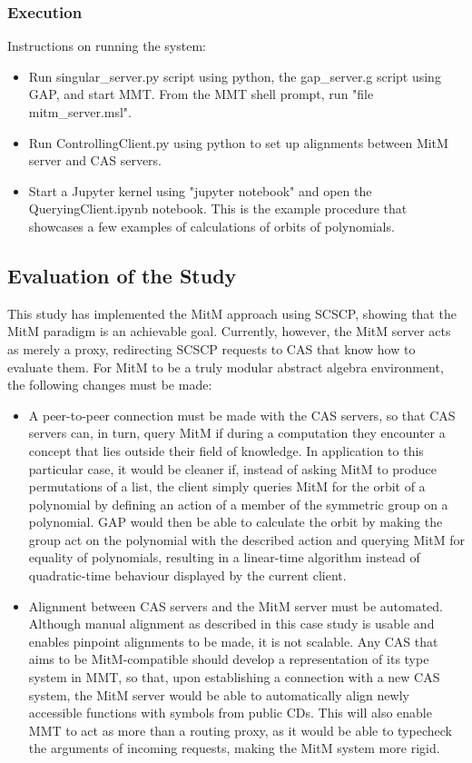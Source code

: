 \subsubsection{Execution}
Instructions on running the system:
\begin{itemize}
  \item Run singular\_server.py script using python, the gap\_server.g script
    using GAP, and start MMT. From the MMT shell prompt, run 
    "file mitm\_server.msl".
  \item Run ControllingClient.py using python to set up alignments between
    MitM server and CAS servers.
  \item Start a Jupyter kernel using "jupyter notebook" and open the 
    QueryingClient.ipynb notebook. This is the example procedure that showcases
    a few examples of calculations of orbits of polynomials.
\end{itemize}

\subsection{Evaluation of the Study}
This study has implemented the MitM approach using SCSCP, showing that the MitM 
paradigm is an achievable goal. Currently, however, the MitM server acts as 
merely a proxy, redirecting SCSCP requests to CAS that know how to evaluate them.
For MitM to be a truly modular abstract algebra environment, the following
changes must be made:
\begin{itemize}
  \item A peer-to-peer connection must be made with the CAS servers, so that
    CAS servers can, in turn, query MitM if during a computation they encounter 
    a concept that lies outside their field of knowledge. In application to
    this particular case, it would be cleaner if, instead of asking MitM to 
    produce permutations of a list, the client simply queries MitM for the orbit 
    of a polynomial by defining an action of a member of the symmetric group on a 
    polynomial. GAP would then be able to calculate the orbit by making the group 
    act on the polynomial with the described action and querying MitM for 
    equality of polynomials, resulting in a linear-time algorithm instead of
    quadratic-time behaviour displayed by the current client.
  \item Alignment between CAS servers and the MitM server must be automated.
    Although manual alignment as described in this case study is usable and
    enables pinpoint alignments to be made, it is not scalable. Any CAS that aims
    to be MitM-compatible should develop a representation of its type system
    in MMT, so that, upon establishing a connection with a new CAS system, the 
    MitM server would be able to automatically align newly accessible functions 
    with symbols from public CDs. This will also enable MMT to act as more than
    a routing proxy, as it would be able to typecheck the arguments of incoming
    requests, making the MitM system more rigid.
\end{itemize}


